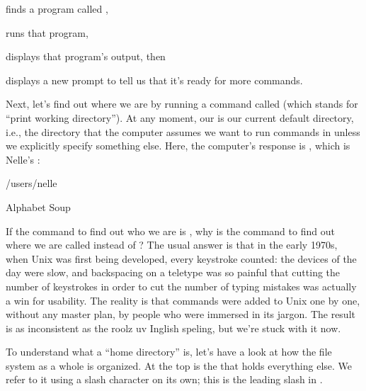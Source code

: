 \begin{swcenumerate}
\item
  finds a program called ,
\item
  runs that program,
\item
  displays that program's output, then
\item
  displays a new prompt to tell us that it's ready for more commands.
\end{swcenumerate}

Next, let's find out where we are by running a command called
 (which stands for ``print working directory''). At any
moment, our  is our current default directory, i.e., the directory that
the computer assumes we want to run commands in unless we explicitly
specify something else. Here, the computer's response is
, which is Nelle's :


\begin{VerbOut}
/users/nelle
\end{VerbOut}

\begin{swcbox}{Alphabet Soup}

If the command to find out who we are is , why is the
command to find out where we are called  instead of
?  The usual answer is that in the early 1970s, when
Unix was first being developed, every keystroke counted: the devices
of the day were slow, and backspacing on a teletype was so painful
that cutting the number of keystrokes in order to cut the number of
typing mistakes was actually a win for usability. The reality is that
commands were added to Unix one by one, without any master plan, by
people who were immersed in its jargon. The result is as inconsistent
as the roolz uv Inglish speling, but we're stuck with it now.

\end{swcbox}

To understand what a ``home directory'' is, let's have a look at how the
file system as a whole is organized. At the top is the
 that holds everything else.
We refer to it using a slash character \code{/} on its own; this is
the leading slash in .


